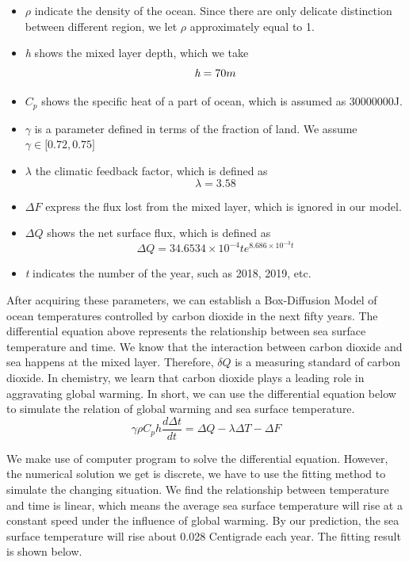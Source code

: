 \documentclass{mcmthesis}
\begin{document}
\begin{itemize}
	\item $\rho$ indicate the density of the ocean. Since there are only delicate distinction between different region, we let $\rho$ approximately equal to 1. 
	\item \emph{h} shows the mixed layer depth, which we take
		\begin{equation*}
		\emph{h}  = 70m
		\end {equation*}
	\item $C_p$ shows the specific heat of a part of ocean, which is assumed as 30000000J.
	\item $\gamma$ is a parameter defined in terms of the fraction of land. We assume $\gamma \in \big[0.72,0.75\big]$ 
	\item $\lambda$ the climatic feedback factor, which is defined as 
		\begin{equation*}
		\lambda = 3.58
		\end {equation*}
	\item  $\Delta F$ express the flux lost from the mixed layer, which is ignored in our model. 
		
	\item $\Delta Q$ shows the net surface flux, which is defined as
		\begin{equation*}
		\Delta Q = 34.6534 \times 10^{-4}te^{8.686\times 10^{-3}t}
		\end {equation*}
	\item \emph{t} indicates the number of the year, such as 2018, 2019, etc.
\end{itemize}
\par
	After acquiring these parameters, we can establish a Box-Diffusion Model of ocean temperatures controlled by carbon dioxide in the next fifty years. The differential equation above represents the relationship between sea surface temperature and time. We know that the interaction between carbon dioxide and sea happens at the mixed layer. Therefore, $\delta Q$ is a measuring standard of carbon dioxide. In chemistry, we learn that carbon dioxide plays a leading role in aggravating global warming. In short, we can use the differential equation below to simulate  the relation of global warming and sea surface temperature.
\begin{equation*}\label{set1}

\gamma\rho C_{p} h\frac{d\Delta t}{dt} = \Delta Q - \lambda\Delta T - \Delta F

\end{equation*}
\par
	We make use of computer program to solve the differential equation. However, the numerical solution we get is discrete, we have to use the fitting method to simulate the changing situation. We find the relationship between temperature and time is linear, which means the average sea surface temperature will rise at a constant speed under the influence of global warming. By our prediction, the sea surface temperature will rise about 0.028 Centigrade each year. The fitting result is shown below.
\par
\end{document}
